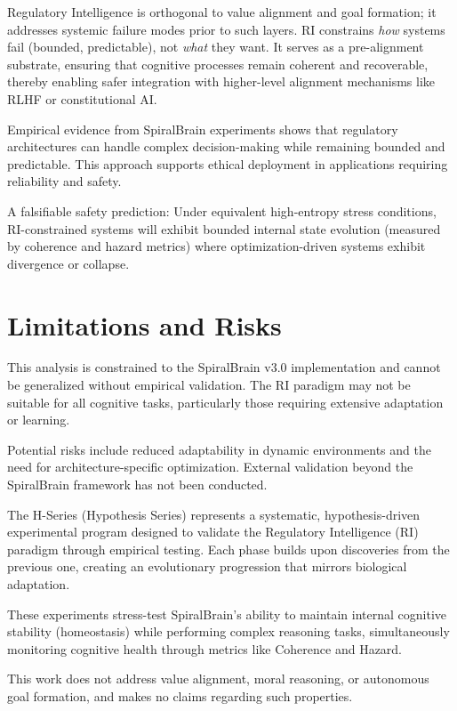 \documentclass[12pt,a4paper]{report}
\begin{document}
Regulatory Intelligence is orthogonal to value alignment and goal formation; it addresses systemic failure modes prior to such layers. RI constrains \emph{how} systems fail (bounded, predictable), not \emph{what} they want. It serves as a pre-alignment substrate, ensuring that cognitive processes remain coherent and recoverable, thereby enabling safer integration with higher-level alignment mechanisms like RLHF or constitutional AI.

Empirical evidence from SpiralBrain experiments shows that regulatory architectures can handle complex decision-making while remaining bounded and predictable. This approach supports ethical deployment in applications requiring reliability and safety.

A falsifiable safety prediction: Under equivalent high-entropy stress conditions, RI-constrained systems will exhibit bounded internal state evolution (measured by coherence and hazard metrics) where optimization-driven systems exhibit divergence or collapse.

\section{Limitations and Risks}

This analysis is constrained to the SpiralBrain v3.0 implementation and cannot be generalized without empirical validation. The RI paradigm may not be suitable for all cognitive tasks, particularly those requiring extensive adaptation or learning.

Potential risks include reduced adaptability in dynamic environments and the need for architecture-specific optimization. External validation beyond the SpiralBrain framework has not been conducted.

The H-Series (Hypothesis Series) represents a systematic, hypothesis-driven experimental program designed to validate the Regulatory Intelligence (RI) paradigm through empirical testing. Each phase builds upon discoveries from the previous one, creating an evolutionary progression that mirrors biological adaptation.

These experiments stress-test SpiralBrain's ability to maintain internal cognitive stability (homeostasis) while performing complex reasoning tasks, simultaneously monitoring cognitive health through metrics like Coherence and Hazard.

This work does not address value alignment, moral reasoning, or autonomous goal formation, and makes no claims regarding such properties.
\end{document}
